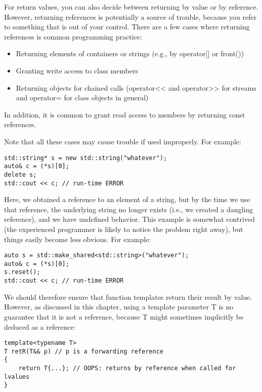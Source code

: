 

For return values, you can also decide between returning by value or by reference. However, returning references is potentially a source of trouble, because you refer to something that is out of your control. There are a few cases where returning references is common programming practice:

\begin{itemize}
\item 
Returning elements of containers or strings (e.g., by operator[] or front())

\item 
Granting write access to class members

\item 
Returning objects for chained calls (operator<< and operator>> for streams and operator= for class objects in general)
\end{itemize}

In addition, it is common to grant read access to members by returning const references.

Note that all these cases may cause trouble if used improperly. For example:

\begin{lstlisting}[style=styleCXX]
std::string* s = new std::string("whatever");
auto& c = (*s)[0];
delete s;
std::cout << c; // run-time ERROR
\end{lstlisting}

Here, we obtained a reference to an element of a string, but by the time we use that reference, the underlying string no longer exists (i.e., we created a dangling reference), and we have undefined behavior. This example is somewhat contrived (the experienced programmer is likely to notice the problem right away), but things easily become less obvious. For example:

\begin{lstlisting}[style=styleCXX]
auto s = std::make_shared<std::string>("whatever");
auto& c = (*s)[0];
s.reset();
std::cout << c; // run-time ERROR
\end{lstlisting}

We should therefore ensure that function templates return their result by value. However, as discussed in this chapter, using a template parameter T is no guarantee that it is not a reference, because T might sometimes implicitly be deduced as a reference:

\begin{lstlisting}[style=styleCXX]
template<typename T>
T retR(T&& p) // p is a forwarding reference
{
	return T{...}; // OOPS: returns by reference when called for lvalues
}
\end{lstlisting}

